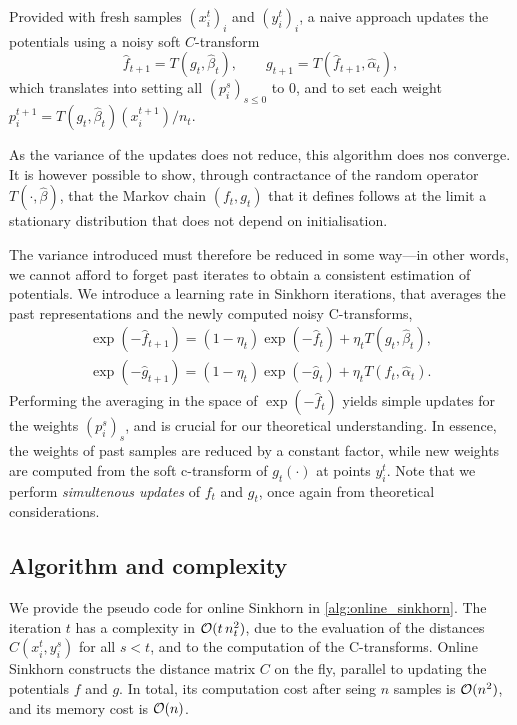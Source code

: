 Provided with fresh samples $(x_i^t)_i$ and $(y_i^t)_i$, a naive approach updates the potentials using a noisy soft $C$-transform
\begin{equation}
    \hat f_{t+1} = T(g_t, \hat \beta_t),\qquad g_{t+1} = T(\hat f_{t+1}, \hat \alpha_t),
\end{equation}
which translates into setting all $(p_i^s)_{s \leq 0}$ to 0, and to set each weight
 $p_i^{t+1} = T(g_t, \hat \beta_t)(x_i^{t+1}) / n_t$.

As the variance of the updates does not reduce, this algorithm does nos
converge. It is however possible to show, through contractance of the random
operator $T(\cdot, \hat \beta)$, that the Markov chain $(f_t, g_t)$ that it
defines follows at the limit a stationary distribution that does not depend on initialisation.

The variance introduced must therefore be reduced in some way---in other words, we cannot afford to forget past iterates to obtain a consistent estimation of potentials. We introduce a learning rate in Sinkhorn iterations, that averages the past representations and the newly computed noisy C-transforms, 
\begin{align}
    \exp(-\hat f_{t+1}) = (1 - \eta_t) \exp(-\hat f_t) + \eta_t T(g_t, \hat \beta_t), \\
    \exp(-\hat g_{t+1}) = (1 - \eta_t) \exp(-\hat g_t) + \eta_t T(f_t, \hat \alpha_t).
\end{align}
Performing the averaging in the space of $\exp(-\hat f_{t})$ yields simple
updates for the weights $(p_i^s)_s$, and is crucial for our theoretical
understanding. In essence, the weights of past samples are reduced by a constant
factor, while new weights are computed from the soft c-transform of $g_t(\cdot)$ at
points $y_i^t$. Note that we perform \textit{simultenous updates} of $f_t$ and
$g_t$, once again from theoretical considerations.

\subsection{Algorithm and complexity}

We provide the pseudo code for online Sinkhorn in \autoref{alg:online_sinkhorn}.
The iteration $t$ has a complexity in $\mathcal{O}(t\,n_t^2)$, due to the evaluation of
the distances $C(x_i^t, y_i^s)$ for all $s < t$, and to the computation of
the C-transforms. Online Sinkhorn constructs the distance matrix $C$ on the
fly, parallel to updating the potentials $f$ and $g$. In total, its computation
cost after seing $n$ samples is $\mathcal{O}(n^2)$, and its memory cost is $\mathcal{O}(n)$.


